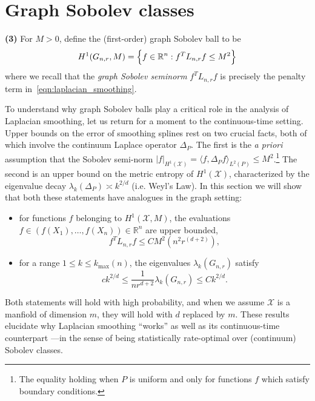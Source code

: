\documentclass{article}
\newcommand{\Reals}{\mathbb{R}}
\newcommand{\1}{\mathbf{1}}
\newcommand{\Lap}{L}
\newcommand{\Xset}{\mathcal{X}}
\newcommand{\Leb}{L}
\theoremstyle{alden}
\theoremstyle{aldenthm}
\theoremstyle{definition}
\theoremstyle{remark}
\begin{document}
\section{Graph Sobolev classes}
\label{sec:graph_sobolev_classes}

\textbf{(3)}  For $M > 0$, define the (first-order) graph Sobolev ball to be
\begin{equation}
\label{eqn:graph_sobolev_ball}
H^1(G_{n,r},M) = \Bigl\{f \in \Reals^n: f^T \Lap_{n,r} f \leq M^2\Bigr\}
\end{equation}
where we recall that the \emph{graph Sobolev seminorm} $f^T \Lap_{{n,r}} f$ is precisely the penalty term in~\eqref{eqn:laplacian_smoothing}. 

To understand why graph Sobolev balls play a critical role in the analysis of Laplacian smoothing, let us return for a moment to the continuous-time setting. Upper bounds on the error of smoothing splines rest on two crucial facts, both of which involve the continuum Laplace operator $\Delta_P$. The first is the \textit{a priori} assumption that the Sobolev semi-norm $|f|_{H^1(\Xset)} = \langle f, \Delta_P f \rangle_{\Leb^2(P)} \leq M^2$.\footnote{The equality holding when $P$ is uniform and  only for functions $f$ which satisfy boundary conditions.} The second is an upper bound on the metric entropy of $H^1(\Xset)$, characterized by the eigenvalue decay $\lambda_k(\Delta_P) \asymp k^{2/d}$ (i.e. Weyl's Law). In this section we will show that both these statements have analogues in the graph setting:
\begin{itemize}
	\item for functions $f$ belonging to $H^1(\Xset,M)$, the evaluations $f \in (f(X_1),\ldots,f(X_n)) \in \Reals^n$ are upper bounded,
	\begin{equation}
	\label{eqn:graph_sobolev_seminorm_vague}
	f^T \Lap_{n,r} f \leq C M^2(n^{2}r^{(d + 2)}),
	\end{equation}
	\item for a range $1 \leq k \leq k_{\max}(n)$, the eigenvalues $\lambda_k(G_{n,r})$ satisfy
	\begin{equation}
	\label{eqn:neighborhood_graph_eigenvalue_vague}
	ck^{2/d} \leq \frac{1}{nr^{d + 2}} \lambda_k(G_{n,r})  \leq Ck^{2/d}.
	\end{equation}
\end{itemize}
Both statements will hold with high probability, and when we assume $\Xset$ is a manfiold of dimension $m$, they will hold with $d$ replaced by $m$.  These results elucidate why Laplacian smoothing ``works'' as well as its continuous-time counterpart ---in the sense of being statistically rate-optimal over (continuum) Sobolev classes.
\end{document}
